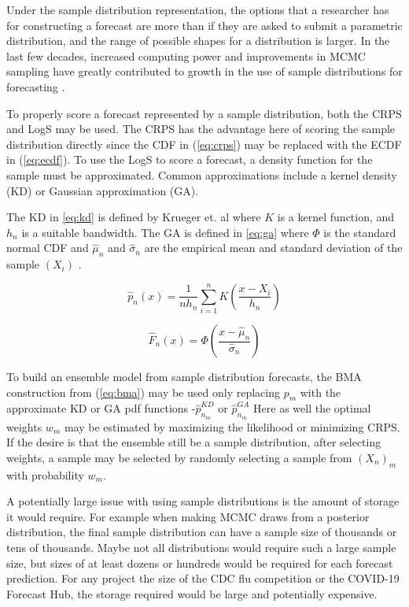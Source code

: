 \documentclass[11pt,notitlepage]{isuthesis}
\begin{document}
Under the sample distribution representation, the options that a researcher has 
for constructing a forecast are more than
if they are asked to submit a parametric distribution, and the range of possible 
shapes for a distribution is larger.
In the last few decades, increased computing power and improvements in MCMC
sampling have greatly contributed to growth in the use of
sample distributions for forecasting \cite{gneiting2007strictly}
\cite[see examples listed therein]{krueger2016probabilistic}.

To properly score a forecast represented by a sample distribution, both the CRPS
and LogS may be used. The CRPS has the advantage here of scoring the sample 
distribution directly since the CDF in  (\ref{eq:crps}) may be replaced with the 
ECDF in
(\ref{eq:ecdf}). To use the LogS to score a forecast, a density function for the 
sample must be approximated. Common approximations include a kernel density (KD)
or Gaussian approximation (GA).

The KD in \eqref{eq:kd} is defined by Krueger et. al 
where $K$ is a kernel function, and $h_n$ is a suitable bandwidth. The GA is 
defined in \eqref{eq:ga} where $\Phi$ is the standard normal CDF and 
$\hat{\mu}_n$ and $\hat{\sigma}_n$
are the empirical mean and standard deviation of the sample $(X_i)$
\cite[see also for a comparison of scoring MCMC drawn forecasts between the CRPS 
and the LogS]{krueger2016probabilistic}.

\begin{equation}
\label{eq:kd}
  \hat{p}_n(x) = \frac{1}{n h_n} \sum_{i=1}^n K \left( \frac{x-X_i}{h_n} \right) 
\end{equation}

\begin{equation}
\label{eq:ga}
  \hat{F}_n(x) = \Phi  \left( \frac{x-\hat{\mu}_n}{\hat{\sigma}_n} \right)
\end{equation}




To build an ensemble model from sample distribution forecasts, the BMA 
construction from (\ref{eq:bma}) may be used only replacing $p_m$ with the
approximate KD or GA pdf functions
-$\hat{p}_{n_m}^{KD}$ or $\hat{p}_{n_m}^{GA}$  
Here as well the optimal weights 
$w_m$ may be estimated by maximizing the likelihood or minimizing CRPS. 
If the desire is that the ensemble still be
a sample distribution, after selecting weights, a sample may be selected by 
randomly selecting a sample from $(X_n)_m$ with probability $w_m$.

A potentially large issue with using sample distributions is the amount of storage
it would require. For example when making MCMC draws from a posterior 
distribution, the final sample distribution can have a sample size of thousands
or tens of thousands. Maybe not all distributions would require such a large 
sample size, but sizes of at least dozens or hundreds would be required for each
forecast prediction. For any project the size of the CDC flu competition or the
COVID-19 Forecast Hub, the storage required would be large and potentially 
expensive.
\end{document}
